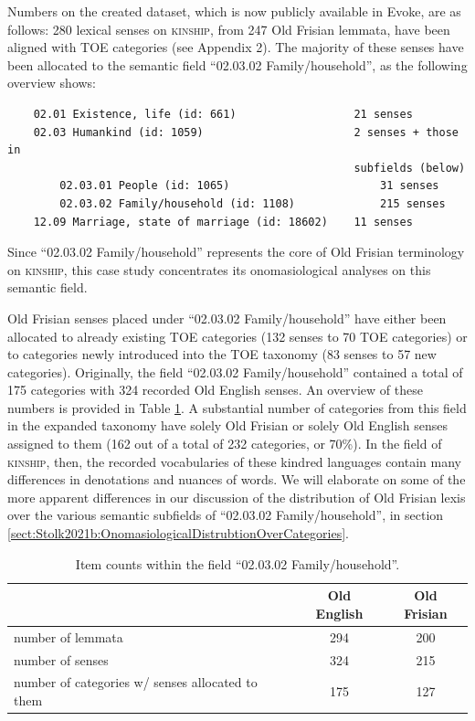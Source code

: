 Numbers on the created dataset, which is now publicly available in Evoke, are as follows: 280 lexical senses on \textsc{kinship}, from 247 Old Frisian lemmata, have been aligned with TOE categories (see Appendix 2).  The majority of these senses have been allocated to the semantic field “02.03.02 Family/household”, as the following overview shows:

\begin{verbatim}
    02.01 Existence, life (id: 661)                  21 senses
    02.03 Humankind (id: 1059)                       2 senses + those in 
                                                     subfields (below)
        02.03.01 People (id: 1065)                       31 senses
        02.03.02 Family/household (id: 1108)             215 senses
    12.09 Marriage, state of marriage (id: 18602)    11 senses
\end{verbatim}

\noindent Since “02.03.02 Family/household” represents the core of Old Frisian terminology on \textsc{kinship}, this case study concentrates its onomasiological analyses on this semantic field.

Old Frisian senses placed under “02.03.02 Family/household” have either been allocated to already existing TOE categories (132 senses to 70 TOE categories) or to categories newly introduced into the TOE taxonomy (83 senses to 57 new categories). Originally, the field “02.03.02 Family/household” contained a total of 175 categories with 324 recorded Old English senses. An overview of these numbers is provided in Table \ref{table:Stolk2021b:item-counts}. A substantial number of categories from this field in the expanded taxonomy have solely Old Frisian or solely Old English senses assigned to them (162 out of a total of 232 categories, or 70\%). In the field of \textsc{kinship}, then, the recorded vocabularies of these kindred languages contain many differences in denotations and nuances of words. We will elaborate on some of the more apparent differences in our discussion of the distribution of Old Frisian lexis over the various semantic subfields of “02.03.02 Family/household”, in section \ref{sect:Stolk2021b:OnomasiologicalDistrubtionOverCategories}.

\begin{table}[ht]
	\normalsize
	\center
	\setlength\tabcolsep{0.5em}
	\begin{tabular}{p{8.9cm}cc}
	\toprule
	                  & \textbf{Old English} & \textbf{Old Frisian} \\
    \midrule
    number of lemmata & 294         & 200 \\
    number of senses  & 324         & 215 \\
    number of categories w/ senses allocated to them & 175 & 127 \\
    \midrule
	\end{tabular}
	\caption{Item counts within the field “02.03.02 Family/household”.\label{table:Stolk2021b:item-counts}}
\end{table}


